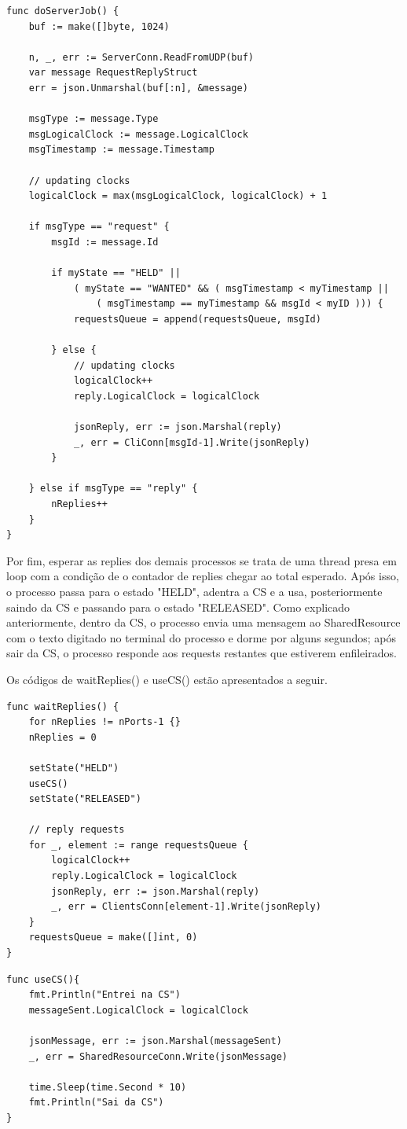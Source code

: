 \documentclass[conference]{IEEEtran}
\begin{document}
\begin{lstlisting}
func doServerJob() {
	buf := make([]byte, 1024)

	n, _, err := ServerConn.ReadFromUDP(buf)
	var message RequestReplyStruct
	err = json.Unmarshal(buf[:n], &message)

	msgType := message.Type
	msgLogicalClock := message.LogicalClock
	msgTimestamp := message.Timestamp

	// updating clocks
	logicalClock = max(msgLogicalClock, logicalClock) + 1

	if msgType == "request" {
		msgId := message.Id

		if myState == "HELD" ||
			( myState == "WANTED" && ( msgTimestamp < myTimestamp ||
				( msgTimestamp == myTimestamp && msgId < myID ))) {
			requestsQueue = append(requestsQueue, msgId)

		} else {
			// updating clocks
			logicalClock++
			reply.LogicalClock = logicalClock

			jsonReply, err := json.Marshal(reply)
			_, err = CliConn[msgId-1].Write(jsonReply)
		}

	} else if msgType == "reply" {
		nReplies++
	}
}
\end{lstlisting}

	Por fim, esperar as replies dos demais processos se trata de uma thread presa em loop com a condição de o contador de replies chegar ao total esperado. Após isso, o processo passa para o estado "HELD", adentra a CS e a usa, posteriormente saindo da CS e passando para o estado "RELEASED". Como explicado anteriormente, dentro da CS, o processo envia uma mensagem ao SharedResource com o texto digitado no terminal do processo e dorme por alguns segundos; após sair da CS, o processo responde aos requests restantes que estiverem enfileirados.
	
	Os códigos de waitReplies() e useCS() estão apresentados a seguir.

\begin{lstlisting}
func waitReplies() {
	for nReplies != nPorts-1 {}
	nReplies = 0

	setState("HELD")
	useCS()
	setState("RELEASED")

	// reply requests
	for _, element := range requestsQueue {
		logicalClock++
		reply.LogicalClock = logicalClock
		jsonReply, err := json.Marshal(reply)
		_, err = ClientsConn[element-1].Write(jsonReply)
	}
	requestsQueue = make([]int, 0)
}
\end{lstlisting}

\begin{lstlisting}
func useCS(){
	fmt.Println("Entrei na CS")
	messageSent.LogicalClock = logicalClock

	jsonMessage, err := json.Marshal(messageSent)
	_, err = SharedResourceConn.Write(jsonMessage)

	time.Sleep(time.Second * 10)
	fmt.Println("Sai da CS")
}
\end{lstlisting}	
\end{document}

